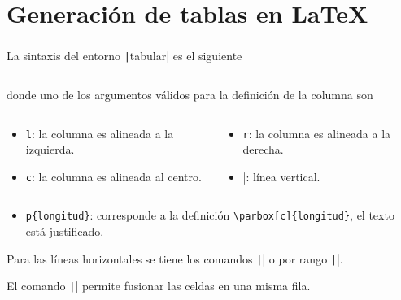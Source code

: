 \section{Generación de tablas en \LaTeX}

\begin{frame}[fragile]
	\frametitle{\secname}

	La sintaxis del entorno \texttt|tabular| es el siguiente
	\inputminted[fontsize=\tiny,frame=single]{latex}{sections/tabular}
	donde uno de los argumentos válidos para la definición de la
	columna son
	\begin{columns}
		\begin{column}{0.48\textwidth}
			\begin{itemize}
				\item

				      \verb|l|: la columna es alineada a la izquierda.

				\item

				      \verb|c|: la columna es alineada al centro.
			\end{itemize}
		\end{column}
		\begin{column}{0.48\textwidth}
			\begin{itemize}
				\item

				      \verb|r|: la columna es alineada a la derecha.

				\item

				      \verb|||: línea vertical.
			\end{itemize}
		\end{column}
	\end{columns}
	\begin{itemize}
		\item

		      \verb|p{longitud}|: corresponde a la definición
		      \verb|\parbox[c]{longitud}|, el texto está justificado.
	\end{itemize}
	Para las líneas horizontales se tiene los comandos
	\texttt|\hline| o por rango
	\texttt||.

	El comando
	\texttt||
	permite fusionar las celdas en una misma fila.

	\begin{example}\end{example} %
\end{frame}
